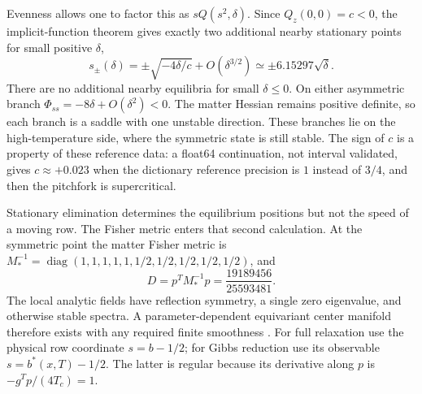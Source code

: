 Evenness allows one to factor this as $sQ(s^2,\delta)$. Since $Q_z(0,0)=c<0$, the implicit-function theorem gives exactly two additional nearby stationary points for small positive $\delta$,
\begin{equation}
 s_\pm(\delta)=\pm\sqrt{-4\delta/c}+O(\delta^{3/2})
              \simeq\pm6.15297\sqrt{\delta}.
 \label{c18:critical-branches}
\end{equation}
There are no additional nearby equilibria for small $\delta\leq0$. On either asymmetric branch $\Phi_{ss}=-8\delta+O(\delta^2)<0$. The matter Hessian remains positive definite, so each branch is a saddle with one unstable direction. These branches lie on the high-temperature side, where the symmetric state is still stable. The sign of $c$ is a property of these reference data: a float64 continuation, not interval validated, gives $c\approx+0.023$ when the dictionary reference precision is $1$ instead of $3/4$, and then the pitchfork is supercritical.

Stationary elimination determines the equilibrium positions but not the speed of a moving row. The Fisher metric enters that second calculation. At the symmetric point the matter Fisher metric is $M_*^{-1}=\operatorname{diag}(1,1,1,1,1,1/2,1/2,1/2,1/2,1/2)$, and
\begin{equation}
 D=p^TM_*^{-1}p=\frac{19189456}{25593481}.
 \label{c18:critical-length}
\end{equation}
The local analytic fields have reflection symmetry, a single zero eigenvalue, and otherwise stable spectra. A parameter-dependent equivariant center manifold therefore exists with any required finite smoothness \citep[Theorem~1.2]{Ruelle1973Symmetry}. For full relaxation use the physical row coordinate $s=b-1/2$; for Gibbs reduction use its observable $s=b^*(x,T)-1/2$. The latter is regular because its derivative along $p$ is $-g^Tp/(4T_c)=1$.

